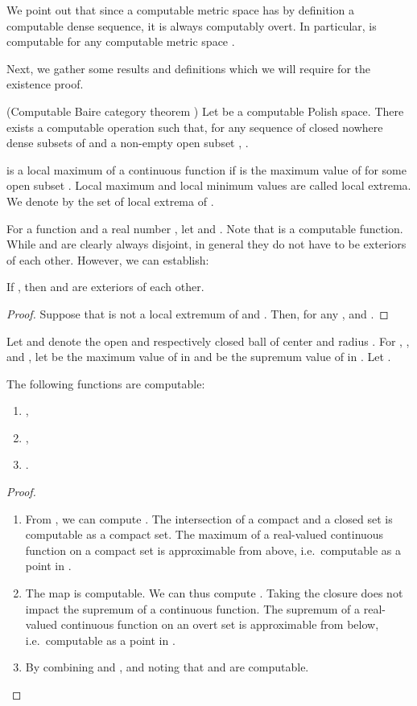 \documentclass{eptcs-modified}
\begin{document}
We point out that since a computable metric space has by definition a computable dense sequence, it is always computably overt. In particular,  is computable for any computable metric space .

Next, we gather some results and definitions which we will require for the existence proof.

\begin{theorem}(Computable Baire category theorem \cite{brattka7})
Let  be a computable Polish space.
There exists a computable operation  such that,  for any sequence  of closed nowhere dense subsets of  and a non-empty open subset ,
.
\end{theorem}

\begin{definition}
   is a local maximum of a continuous function  if  is the maximum value of  for some open subset .  Local maximum and local minimum values are called local extrema.
We denote by  the set of local extrema of .
\end{definition}

For a function  and a real number ,  let
 and
. Note that  is a computable function. While  and  are clearly always disjoint, in general they do not have to be exteriors of each other. However, we can establish:


\begin{lemma}\label{lemma0}
If , then  and   are exteriors of each other.
\end{lemma}

\begin{proof}
  Suppose that  is not a local extremum of  and .
  Then, for any ,  and
  .
\end{proof}

Let  and  denote the open and respectively closed ball of  center  and radius . For , ,  and , let  be the maximum value of  in  and  be the supremum value of  in . Let .

\begin{lemma}
\label{lem:mmd}
The following functions are computable:
\begin{enumerate}
\item ,
\item ,
\item .
\end{enumerate}
\begin{proof}
\begin{enumerate}
\item From ,  we can compute . The intersection of a compact and a closed set is computable as a compact set. The maximum of a real-valued continuous function on a compact set is approximable from above, i.e.~computable as a point in .
\item The map  is computable. We can thus compute . Taking the closure does not impact the supremum of a continuous function. The supremum of a real-valued continuous function on an overt set is approximable from below, i.e.~computable as a point in .
\item By combining  and , and noting that  and  are computable.
\end{enumerate}
\end{proof}
\end{lemma}
\end{document}
